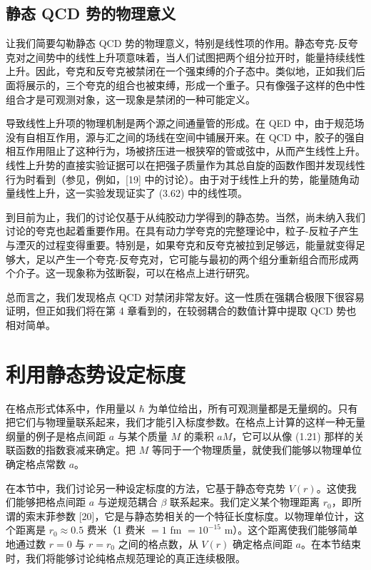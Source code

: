 \subsection{静态 QCD 势的物理意义}

让我们简要勾勒静态 QCD 势的物理意义，特别是线性项的作用。静态夸克-反夸克对之间势中的线性上升项意味着，当人们试图把两个组分拉开时，能量持续线性上升。因此，夸克和反夸克被禁闭在一个强束缚的介子态中。类似地，正如我们后面将展示的，三个夸克的组合也被束缚，形成一个重子。只有像强子这样的色中性组合才是可观测对象，这一现象是禁闭的一种可能定义。

导致线性上升项的物理机制是两个源之间通量管的形成。在 QED 中，由于规范场没有自相互作用，源与汇之间的场线在空间中铺展开来。在 QCD 中，胶子的强自相互作用阻止了这种行为，场被挤压进一根狭窄的管或弦中，从而产生线性上升。线性上升势的直接实验证据可以在把强子质量作为其总自旋的函数作图并发现线性行为时看到（参见，例如，[19] 中的讨论）。由于对于线性上升的势，能量随角动量线性上升，这一实验发现证实了 (3.62) 中的线性项。

到目前为止，我们的讨论仅基于从纯胶动力学得到的静态势。当然，尚未纳入我们讨论的夸克也起着重要作用。在具有动力学夸克的完整理论中，粒子-反粒子产生与湮灭的过程变得重要。特别是，如果夸克和反夸克被拉到足够远，能量就变得足够大，足以产生一个夸克-反夸克对，它可能与最初的两个组分重新组合而形成两个介子。这一现象称为弦断裂，可以在格点上进行研究。

总而言之，我们发现格点 QCD 对禁闭非常友好。这一性质在强耦合极限下很容易证明，但正如我们将在第 4 章看到的，在较弱耦合的数值计算中提取 QCD 势也相对简单。

\section{利用静态势设定标度}

在格点形式体系中，作用量以 $\hbar$ 为单位给出，所有可观测量都是无量纲的。只有把它们与物理量联系起来，我们才能引入标度参数。在格点上计算的这样一种无量纲量的例子是格点间距 $a$ 与某个质量 $M$ 的乘积 $aM$，它可以从像 (1.21) 那样的关联函数的指数衰减来确定。把 $M$ 等同于一个物理质量，就使我们能够以物理单位确定格点常数 $a$。

在本节中，我们讨论另一种设定标度的方法，它基于静态夸克势 $V(r)$。这使我们能够把格点间距 $a$ 与逆规范耦合 $\beta$ 联系起来。我们定义某个物理距离 $r_0$，即所谓的索末菲参数 [20]，它是与静态势相关的一个特征长度标度。以物理单位计，这个距离是 $r_0 \approx 0.5$ 费米（1 费米 $= 1$ fm $= 10^{-15}$ m）。这个距离使我们能够简单地通过数 $r = 0$ 与 $r = r_0$ 之间的格点数，从 $V(r)$ 确定格点间距 $a$。在本节结束时，我们将能够讨论纯格点规范理论的真正连续极限。

